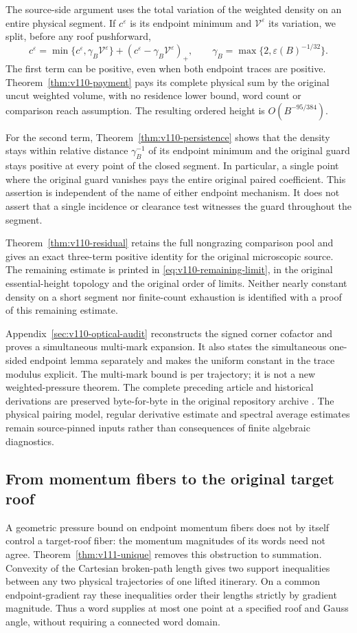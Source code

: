 \documentclass[11pt,reqno]{amsart}
\numberwithin{equation}{section}
\theoremstyle{definition}\newtheorem{definition}[theorem]{Definition}
\theoremstyle{remark}\newtheorem{remark}[theorem]{Remark}
\begin{document}
The source-side argument uses the total variation of the
weighted density on an entire physical segment. If $c^\varepsilon$
is its endpoint minimum and $\mathcal V^\varepsilon$ its variation,
we split, before any roof pushforward,
\[
 c^\varepsilon
   =\min\{c^\varepsilon,\gamma_B\mathcal V^\varepsilon\}
       +(c^\varepsilon-\gamma_B\mathcal V^\varepsilon)_+,
 \qquad \gamma_B=\max\{2,\varepsilon(B)^{-1/32}\}.
\]
The first term can be positive, even when both endpoint traces are
positive. Theorem~\ref{thm:v110-payment} pays its complete physical
sum by the original uncut weighted volume, with no residence lower
bound, word count or comparison reach assumption. The resulting
ordered height is $O(B^{-95/384})$.

For the second term, Theorem~\ref{thm:v110-persistence} shows that the
density stays within relative distance $\gamma_B^{-1}$ of its
endpoint minimum and the original guard stays positive at every
point of the closed segment. In particular, a single point where
the original guard vanishes pays the entire original paired
coefficient. This assertion is independent of the name of either
endpoint mechanism. It does not assert that a single incidence or
clearance test witnesses the guard throughout the segment.

Theorem~\ref{thm:v110-residual} retains the full nongrazing comparison
pool and gives an exact three-term positive identity for the
original microscopic source. The remaining estimate is printed in
\eqref{eq:v110-remaining-limit}, in the original essential-height
topology and the original order of limits. Neither nearly constant
density on a short segment nor finite-count exhaustion is identified
with a proof of this remaining estimate.

Appendix~\ref{sec:v110-optical-audit} reconstructs the signed corner
cofactor and proves a simultaneous multi-mark expansion. It also
states the simultaneous one-sided endpoint lemma separately and
makes the uniform constant in the trace modulus explicit. The
multi-mark bound is per trajectory; it is not a new weighted-pressure
theorem. The complete preceding article and historical derivations
are preserved byte-for-byte in the original repository archive \cite{Q110}.
The physical pairing model, regular derivative estimate and spectral
average estimates remain source-pinned inputs rather than consequences
of finite algebraic diagnostics.

\subsection*{From momentum fibers to the original target roof}
A geometric pressure bound on endpoint momentum fibers does not by
itself control a target-roof fiber: the momentum magnitudes of its
words need not agree. Theorem~\ref{thm:v111-unique} removes this
obstruction to summation. Convexity of the Cartesian broken-path
length gives two support inequalities between any two physical
trajectories of one lifted itinerary. On a common endpoint-gradient
ray these inequalities order their lengths strictly by gradient
magnitude. Thus a word supplies at most one point at a specified
roof and Gauss angle, without requiring a connected word domain.
\end{document}
